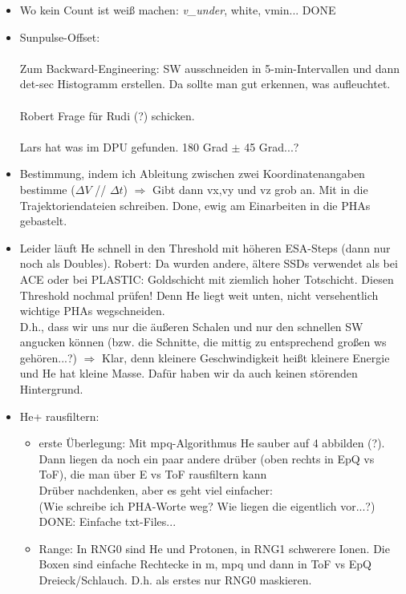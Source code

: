\documentclass[11pt,letterpaper]{article}
\begin{document}
\begin{itemize}
	\item {} Wo kein Count ist weiß machen: \textit{v\_under}, white, vmin... DONE
	\item Sunpulse-Offset: \\ \\Zum Backward-Engineering: SW ausschneiden in 5-min-Intervallen und dann det-sec Histogramm erstellen. Da sollte man gut erkennen, was aufleuchtet.\\ \\ Robert Frage für Rudi (?) schicken.\\ \\
	Lars hat was im DPU gefunden.  180 Grad $\pm$ 45 Grad...?
	\item {} Bestimmung, indem ich Ableitung zwischen zwei Koordinatenangaben bestimme ($\Delta V$ // $\Delta t$) $\Rightarrow$ Gibt dann vx,vy und vz grob an. Mit in die Trajektoriendateien schreiben. Done, ewig am Einarbeiten in die PHAs gebastelt.
	\item Leider läuft He schnell in den Threshold mit höheren ESA-Steps (dann nur noch als Doubles). Robert: Da wurden andere, ältere SSDs verwendet als bei ACE oder bei PLASTIC: Goldschicht mit ziemlich hoher Totschicht.  Diesen Threshold nochmal prüfen! Denn He liegt weit unten, nicht versehentlich wichtige PHAs wegschneiden. \\	 
	D.h., dass wir uns nur die äußeren Schalen und nur den schnellen SW angucken können (bzw. die Schnitte, die mittig zu entsprechend großen ws gehören...?) $\Rightarrow$ Klar, denn kleinere Geschwindigkeit heißt kleinere Energie und He hat kleine Masse.  Dafür haben wir da auch keinen störenden Hintergrund.
	\item He+ rausfiltern:
	\begin{itemize}
		\item erste Überlegung: Mit mpq-Algorithmus He sauber auf 4 abbilden (?). Dann liegen da noch ein paar andere drüber (oben rechts in EpQ vs ToF), die man über E vs ToF rausfiltern kann\\
		Drüber nachdenken, aber es geht viel einfacher:
		\\  (Wie schreibe ich PHA-Worte weg? Wie liegen die eigentlich vor...?) DONE: Einfache txt-Files...
		\item Range: In RNG0 sind He und Protonen, in RNG1 schwerere Ionen. Die Boxen sind einfache Rechtecke in m, mpq und dann in ToF vs EpQ Dreieck/Schlauch. D.h. als erstes nur RNG0 maskieren.

\end{itemize}
\end{itemize}
\end{document}
